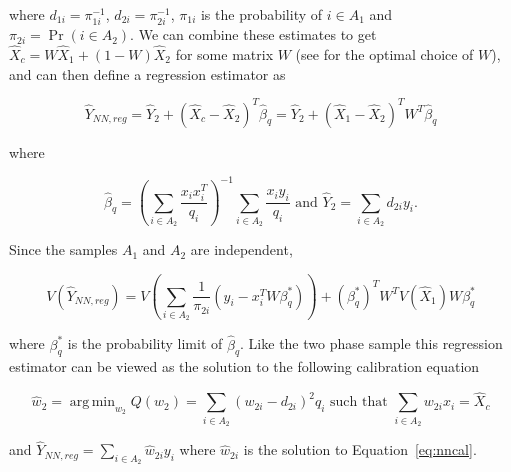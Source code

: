 \documentclass[12pt]{article}
\DeclareMathOperator*{\argmin}{arg\,min}
\begin{document}
where $d_{1i} = \pi_{1i}^{-1}$, $d_{2i} = \pi_{2i}^{-1}$, $\pi_{1i}$ is the
probability of $i \in A_1$ and $\pi_{2i} = \Pr(i \in A_2)$. 
We can combine these estimates to get
$\hat X_c = W \hat X_1 + (1 - W)\hat X_2$ for some matrix $W$ (see
\cite{merkouris2004combining} for the optimal choice of $W$), and can then define
a regression estimator as

$$
\hat Y_{NN, reg} = \hat Y_2 + (\hat X_c - \hat X_2)^T \hat \beta_q = 
\hat Y_2 + (\hat X_1 - \hat X_2)^T W^T\hat \beta_q 
$$

where %

$$\hat \beta_q = \left(\sum_{i \in A_2} \frac{x_i x_i^T}{q_i}\right)^{-1}
\sum_{i \in A_2} \frac{x_i y_i}{q_i} \text{ and }\hat Y_2 = \sum_{i \in A_2}
d_{2i} y_i. $$

Since the samples $A_1$ and $A_2$ are independent, 

$$V(\hat Y_{NN, reg}) = V\left(\sum_{i \in A_2} \frac{1}{\pi_{2i}}(y_i -
x_i^TW\beta^*_q)\right) + (\beta^*_q)^T W^T V(\hat X_1) W \beta_q^*$$

where $\beta_q^*$ is the probability limit of $\hat \beta_q$. Like the two phase
sample this regression estimator can be viewed as the solution to the following
calibration equation 

\begin{equation}\label{eq:nncal}
  \hat w_2 = \argmin_{w_2} Q(w_2) = \sum_{i \in A_2} (w_{2i} - d_{2i})^2 q_i 
  \text{ such that } \sum_{i \in A_2} w_{2i} x_i = \hat X_c
\end{equation}

and $\hat Y_{NN, reg} = \sum_{i \in A_2} \hat w_{2i} y_i$ where $\hat
w_{2i}$ is the solution to Equation~\ref{eq:nncal}.
\end{document}
